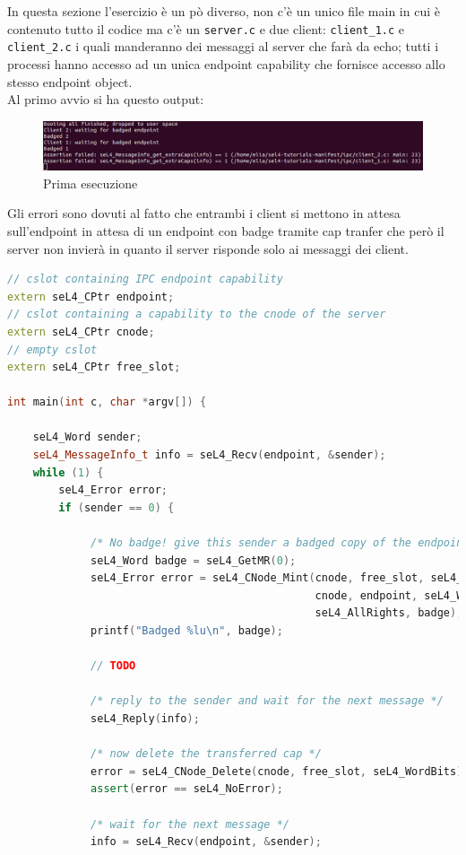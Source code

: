 In questa sezione l'esercizio è un pò diverso, non c'è un unico file main in cui è contenuto tutto il codice ma c'è un \texttt{server.c} e due client: \texttt{client\_1.c} e \texttt{client\_2.c} i quali manderanno dei messaggi al server che farà da echo; tutti i processi hanno accesso ad un unica endpoint capability che fornisce accesso allo stesso endpoint object.\\
Al primo avvio si ha questo output:
\begin{figure}[h]
  \includegraphics[width=\linewidth]{img/PrimoAvvioIPC.png}
  \caption{Prima esecuzione}
  \label{fig:TutorialThreads}
\end{figure}
Gli errori sono dovuti al fatto che entrambi i client si mettono in attesa sull'endpoint in attesa di un endpoint con badge tramite cap tranfer che però il server non invierà in quanto il server risponde solo ai messaggi dei client.
\begin{lstlisting}[language=C++]
// cslot containing IPC endpoint capability
extern seL4_CPtr endpoint;
// cslot containing a capability to the cnode of the server
extern seL4_CPtr cnode;
// empty cslot
extern seL4_CPtr free_slot;

int main(int c, char *argv[]) {

	seL4_Word sender;
    seL4_MessageInfo_t info = seL4_Recv(endpoint, &sender);
    while (1) {
	    seL4_Error error;
        if (sender == 0) {

             /* No badge! give this sender a badged copy of the endpoint */
             seL4_Word badge = seL4_GetMR(0);
             seL4_Error error = seL4_CNode_Mint(cnode, free_slot, seL4_WordBits,
                                                cnode, endpoint, seL4_WordBits,
                                                seL4_AllRights, badge);
             printf("Badged %lu\n", badge);

             // TODO
             
             /* reply to the sender and wait for the next message */
             seL4_Reply(info);

             /* now delete the transferred cap */
             error = seL4_CNode_Delete(cnode, free_slot, seL4_WordBits);
             assert(error == seL4_NoError);

             /* wait for the next message */
             info = seL4_Recv(endpoint, &sender);
\end{lstlisting}
